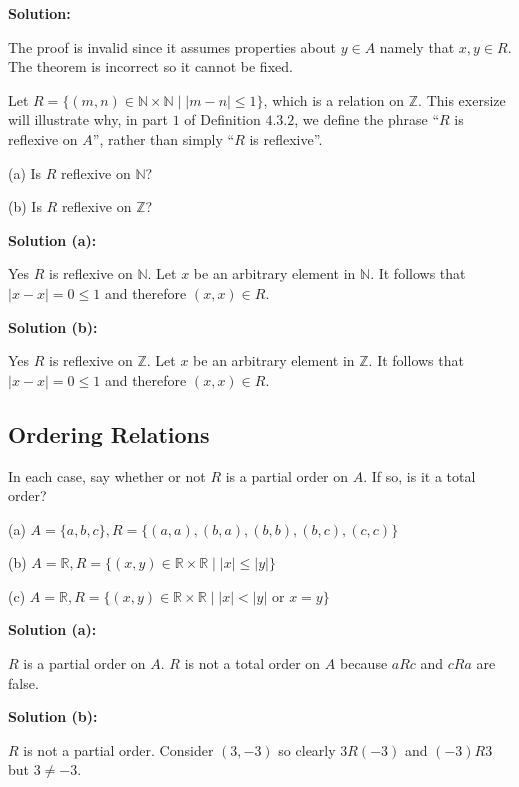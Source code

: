 \textbf{Solution:}

The proof is invalid since it assumes properties about $y \in A$ namely that $x, y \in R$.
The theorem is incorrect so it cannot be fixed.

\begin{tcolorbox}[title=Problem 24, breakable]
    Let $R = \{(m, n) \in \mathbb{N} \times \mathbb{N} \mid |m - n| \le 1\}$,
    which is a relation on $\mathbb{Z}$. This exersize will illustrate
    why, in part $1$ of Definition $4.3.2$, we define the phrase ``$R$ is 
    reflexive on $A$'', rather than simply ``$R$ is reflexive''.
    
    (a) Is $R$ reflexive on $\mathbb{N}$?

    (b) Is $R$ reflexive on $\mathbb{Z}$?
\end{tcolorbox}

\textbf{Solution (a):}

Yes $R$ is reflexive on $\mathbb{N}$. Let $x$ be an arbitrary element in $\mathbb{N}$.
    It follows that $|x - x| = 0 \le 1$ and therefore $(x, x) \in R$.
    
\textbf{Solution (b):} 

Yes $R$ is reflexive on $\mathbb{Z}$. Let $x$ be an arbitrary element in $\mathbb{Z}$.
    It follows that $|x - x| = 0 \le 1$ and therefore $(x, x) \in R$.

\subsection{Ordering Relations}

\begin{tcolorbox}[title=Problem 1, breakable]
    In each case, say whether or not $R$ is a partial order on $A$.
    If so, is it a total order? 

    (a) $A = \{a, b, c\}, R = \{(a, a), (b, a), (b, b), (b, c), (c, c)\}$ 

    (b) $A = \mathbb{R}, R = \{(x, y) \in \mathbb{R} \times \mathbb{R} \mid |x| \le |y|\}$ 

    (c) $A = \mathbb{R}, R = \{(x, y) \in \mathbb{R} \times \mathbb{R} \mid |x| < |y| \text{ or } x = y\}$
\end{tcolorbox}

\textbf{Solution (a):}

$R$ is a partial order on $A$.
$R$ is not a total order on $A$ because $aRc$ and $cRa$ are false.

\textbf{Solution (b):}

$R$ is not a partial order.
Consider $(3, -3)$ so clearly $3R(-3)$ and $(-3)R3$ but $3 \not= -3$.

